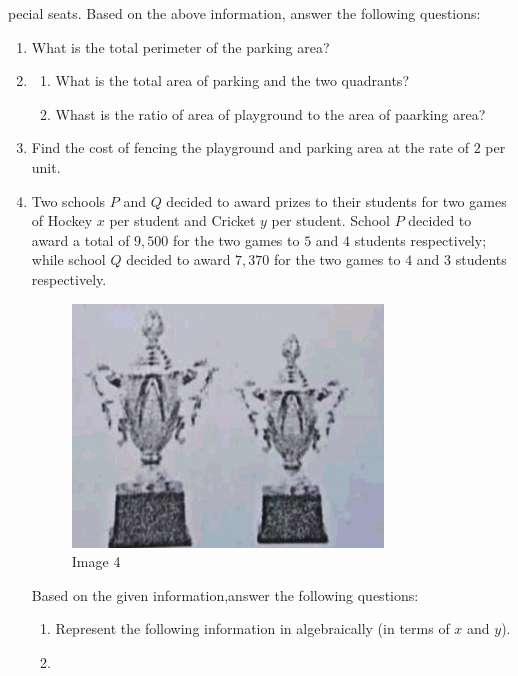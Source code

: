 \documentclass[12pt,-letter paper]{article}
\begin{document}
\begin{enumerate}
pecial seats.
Based on the above information, answer the following questions:
\begin{enumerate}
\item
What is the total perimeter of the parking area?
\item
\begin{enumerate}
\item
What is the total area of parking and the two quadrants?
\item
Whast is the ratio of area of playground to the area of paarking area?
\end{enumerate}
\item
Find the cost of fencing the playground and parking area at the rate of \rupee $2$ per unit.
\newpage
\item
Two schools $P$ and $Q$ decided to award prizes to their students for two games of Hockey \rupee $x$ per student and Cricket \rupee $y$ per student. School $P$ decided to award a total of \rupee $9,500$ for the two games to $5$ and $4$ students respectively; while school $Q$ decided to award
 \rupee $7,370$ for the two games to $4$ and $3$ students respectively.
\begin{figure}[h!]
\centering
\includegraphics[width=\columnwidth]{img4.jpg}
\caption{Image 4}
\end{figure}
Based on the given information,answer the following questions:
\begin{enumerate}
\item
Represent the following information in algebraically (in terms of $x$ and $y$).
\item

\end{enumerate}
\end{enumerate}
\end{enumerate}
\end{document}
